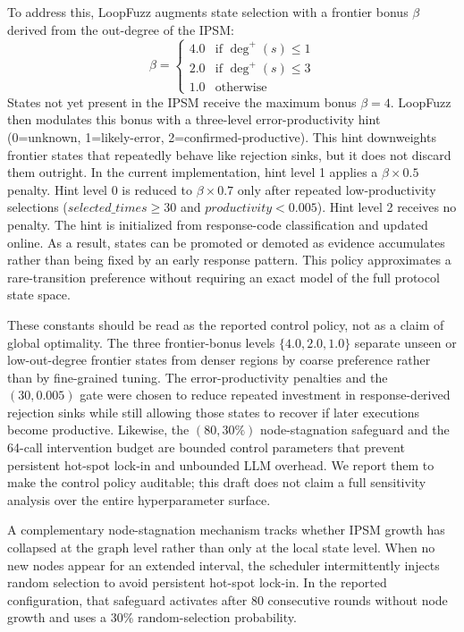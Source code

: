 \documentclass[conference]{IEEEtran}
\begin{document}
To address this, LoopFuzz augments state selection with a frontier bonus $\beta$ derived from the out-degree of the IPSM:
\[
\beta = \begin{cases}
4.0 & \text{if } \deg^+(s) \le 1 \\
2.0 & \text{if } \deg^+(s) \le 3 \\
1.0 & \text{otherwise}
\end{cases}
\]
States not yet present in the IPSM receive the maximum bonus $\beta{=}4$. LoopFuzz then modulates this bonus with a three-level error-productivity hint (0=unknown, 1=likely-error, 2=confirmed-productive). This hint downweights frontier states that repeatedly behave like rejection sinks, but it does not discard them outright. In the current implementation, hint level 1 applies a $\beta{\times}0.5$ penalty. Hint level 0 is reduced to $\beta{\times}0.7$ only after repeated low-productivity selections ($\mathit{selected\_times}{\ge}30$ and $\mathit{productivity}{<}0.005$). Hint level 2 receives no penalty. The hint is initialized from response-code classification and updated online. As a result, states can be promoted or demoted as evidence accumulates rather than being fixed by an early response pattern. This policy approximates a rare-transition preference without requiring an exact model of the full protocol state space.

These constants should be read as the reported control policy, not as a claim of global optimality. The three frontier-bonus levels $\{4.0,2.0,1.0\}$ separate unseen or low-out-degree frontier states from denser regions by coarse preference rather than by fine-grained tuning. The error-productivity penalties and the $(30,0.005)$ gate were chosen to reduce repeated investment in response-derived rejection sinks while still allowing those states to recover if later executions become productive. Likewise, the $(80,30\%)$ node-stagnation safeguard and the 64-call intervention budget are bounded control parameters that prevent persistent hot-spot lock-in and unbounded LLM overhead. We report them to make the control policy auditable; this draft does not claim a full sensitivity analysis over the entire hyperparameter surface.

A complementary node-stagnation mechanism tracks whether IPSM growth has collapsed at the graph level rather than only at the local state level. When no new nodes appear for an extended interval, the scheduler intermittently injects random selection to avoid persistent hot-spot lock-in. In the reported configuration, that safeguard activates after 80 consecutive rounds without node growth and uses a 30\% random-selection probability.
\end{document}
